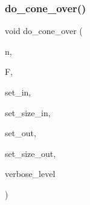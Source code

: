 \subsubsection{\texorpdfstring{do\+\_\+cone\+\_\+over()}{do\_cone\_over()}}
{\footnotesize\ttfamily void do\+\_\+cone\+\_\+over (\begin{DoxyParamCaption}\item[{\mbox{\hyperlink{galois_8h_a09fddde158a3a20bd2dcadb609de11dc}{I\+NT}}}]{n,  }\item[{\mbox{\hyperlink{classfinite__field}{finite\+\_\+field}} $\ast$}]{F,  }\item[{\mbox{\hyperlink{galois_8h_a09fddde158a3a20bd2dcadb609de11dc}{I\+NT}} $\ast$}]{set\+\_\+in,  }\item[{\mbox{\hyperlink{galois_8h_a09fddde158a3a20bd2dcadb609de11dc}{I\+NT}}}]{set\+\_\+size\+\_\+in,  }\item[{\mbox{\hyperlink{galois_8h_a09fddde158a3a20bd2dcadb609de11dc}{I\+NT}} $\ast$\&}]{set\+\_\+out,  }\item[{\mbox{\hyperlink{galois_8h_a09fddde158a3a20bd2dcadb609de11dc}{I\+NT}} \&}]{set\+\_\+size\+\_\+out,  }\item[{\mbox{\hyperlink{galois_8h_a09fddde158a3a20bd2dcadb609de11dc}{I\+NT}}}]{verbose\+\_\+level }\end{DoxyParamCaption})}

